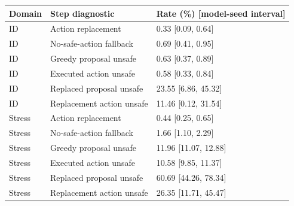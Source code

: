 \begin{tabular}{lll}
\toprule
Domain & Step diagnostic & Rate (\%) [model-seed interval] \\
\midrule
ID & Action replacement & 0.33 [0.09, 0.64] \\
ID & No-safe-action fallback & 0.69 [0.41, 0.95] \\
ID & Greedy proposal unsafe & 0.63 [0.37, 0.89] \\
ID & Executed action unsafe & 0.58 [0.33, 0.84] \\
ID & Replaced proposal unsafe & 23.55 [6.86, 45.32] \\
ID & Replacement action unsafe & 11.46 [0.12, 31.54] \\
Stress & Action replacement & 0.44 [0.25, 0.65] \\
Stress & No-safe-action fallback & 1.66 [1.10, 2.29] \\
Stress & Greedy proposal unsafe & 11.96 [11.07, 12.88] \\
Stress & Executed action unsafe & 10.58 [9.85, 11.37] \\
Stress & Replaced proposal unsafe & 60.69 [44.26, 78.34] \\
Stress & Replacement action unsafe & 26.35 [11.71, 45.47] \\
\bottomrule
\end{tabular}
